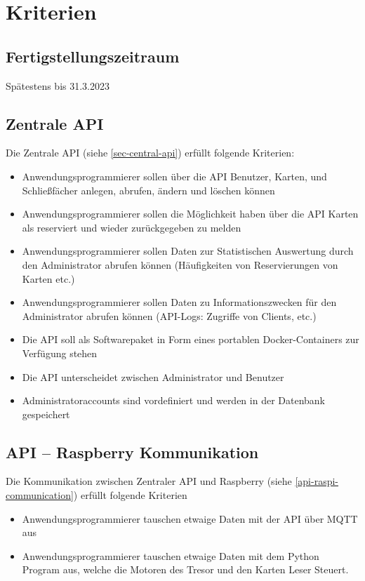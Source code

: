 \newpage

\section{Kriterien}
\subsection{Fertigstellungszeitraum}
Sp\"atestens bis 31.3.2023

\subsection{Zentrale API}
Die Zentrale API (siehe \ref{sec-central-api}) erfüllt folgende Kriterien:
\begin{itemize}
    \item Anwendungsprogrammierer sollen über die API Benutzer, Karten, und Schließfächer anlegen, abrufen, ändern und löschen können
    \item Anwendungsprogrammierer sollen die Möglichkeit haben über die API Karten als reserviert und wieder zurückgegeben zu melden
    \item Anwendungsprogrammierer sollen Daten zur Statistischen Auswertung durch den Administrator abrufen können (Häufigkeiten von Reservierungen von Karten etc.)
    \item Anwendungsprogrammierer sollen Daten zu Informationszwecken für den Administrator abrufen können (API-Logs: Zugriffe von Clients, etc.)
    \item Die API soll als Softwarepaket in Form eines portablen Docker-Containers zur Verfügung stehen
    \item Die API unterscheidet zwischen Administrator und Benutzer
    \item Administratoraccounts sind vordefiniert und werden in der Datenbank gespeichert 
\end{itemize}

\subsection{API -- Raspberry Kommunikation}
Die Kommunikation zwischen Zentraler API und Raspberry (siehe \ref{api-raspi-communication}) erfüllt folgende Kriterien 
\begin{itemize}
    \item Anwendungsprogrammierer tauschen etwaige Daten mit der API über MQTT aus
    \item Anwendungsprogrammierer tauschen etwaige Daten mit dem Python Program aus, welche die Motoren des Tresor und den Karten Leser Steuert.
\end{itemize}

